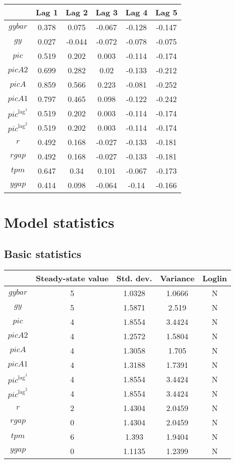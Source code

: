 \begin{tabular}{c|ccccc|}
  & Lag 1 & Lag 2 & Lag 3 & Lag 4 & Lag 5\\
\hline
${g\!y\!b\!a\!r}$ & 0.378 & 0.075 & -0.067 & -0.128 & -0.147 \\
${g\!y}$ & 0.027 & -0.044 & -0.072 & -0.078 & -0.075 \\
${p\!i\!c}$ & 0.519 & 0.202 & 0.003 & -0.114 & -0.174 \\
${p\!i\!c\!A\!2}$ & 0.699 & 0.282 & 0.02 & -0.133 & -0.212 \\
${p\!i\!c\!A}$ & 0.859 & 0.566 & 0.223 & -0.081 & -0.252 \\
${p\!i\!c\!A\!1}$ & 0.797 & 0.465 & 0.098 & -0.122 & -0.242 \\
${p\!i\!c}^{\mathrm{lag}^{\mathrm{1}}}$ & 0.519 & 0.202 & 0.003 & -0.114 & -0.174 \\
${p\!i\!c}^{\mathrm{lag}^{\mathrm{2}}}$ & 0.519 & 0.202 & 0.003 & -0.114 & -0.174 \\
$r$ & 0.492 & 0.168 & -0.027 & -0.133 & -0.181 \\
${r\!g\!a\!p}$ & 0.492 & 0.168 & -0.027 & -0.133 & -0.181 \\
${t\!p\!m}$ & 0.647 & 0.34 & 0.101 & -0.067 & -0.173 \\
${y\!g\!a\!p}$ & 0.414 & 0.098 & -0.064 & -0.14 & -0.166 \\
\hline
\end{tabular}


\section{Model statistics}

\subsection{Basic statistics}

\begin{tabular}{c|c|c|c|c|}
  & Steady-state value & Std. dev. & Variance & Loglin\\
\hline
${g\!y\!b\!a\!r}$ & 5 & 1.0328 & 1.0666 & N    \\
${g\!y}$ & 5 & 1.5871 & 2.519 & N    \\
${p\!i\!c}$ & 4 & 1.8554 & 3.4424 & N    \\
${p\!i\!c\!A\!2}$ & 4 & 1.2572 & 1.5804 & N    \\
${p\!i\!c\!A}$ & 4 & 1.3058 & 1.705 & N    \\
${p\!i\!c\!A\!1}$ & 4 & 1.3188 & 1.7391 & N    \\
${p\!i\!c}^{\mathrm{lag}^{\mathrm{1}}}$ & 4 & 1.8554 & 3.4424 & N    \\
${p\!i\!c}^{\mathrm{lag}^{\mathrm{2}}}$ & 4 & 1.8554 & 3.4424 & N    \\
$r$ & 2 & 1.4304 & 2.0459 & N    \\
${r\!g\!a\!p}$ & 0 & 1.4304 & 2.0459 & N    \\
${t\!p\!m}$ & 6 & 1.393 & 1.9404 & N    \\
${y\!g\!a\!p}$ & 0 & 1.1135 & 1.2399 & N    \\
\hline
\end{tabular}


